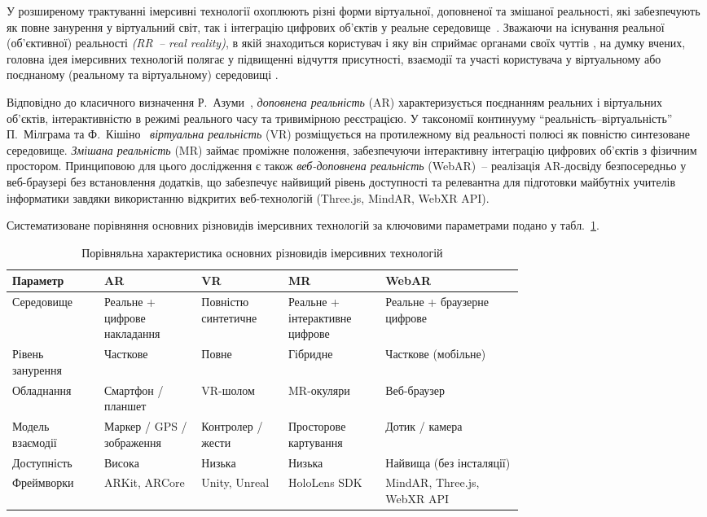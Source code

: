 У розширеному трактуванні імерсивні технології охоплюють різні форми віртуальної, доповненої та змішаної реальності, які забезпечують як повне занурення у віртуальний світ, так і інтеграцію цифрових об'єктів у реальне середовище~\cite{DiNatale2020Immersive}. Зважаючи на існування реальної (об'єктивної) реальності \emph{(RR~-- real reality)}, в якій знаходиться користувач і яку він сприймає органами своїх чуттів \cite{Omelchuk2024Secondary}, на думку вчених, головна ідея імерсивних технологій полягає у підвищенні відчуття присутності, взаємодії та участі користувача у віртуальному або поєднаному (реальному та віртуальному) середовищі \cite{Omelchuk2024Secondary, Semerikov2021Ref}.

Відповідно до класичного визначення Р.~Азуми~\cite{TechGlossaryAR2020}, \emph{доповнена реальність} (AR) характеризується поєднанням реальних і віртуальних об'єктів, інтерактивністю в режимі реального часу та тривимірною реєстрацією. У таксономії континууму ``реальність--віртуальність'' П.~Мілграма та Ф.~Кішіно~\cite{KVR2017Definition} \emph{віртуальна реальність} (VR) розміщується на протилежному від реальності полюсі як повністю синтезоване середовище. \emph{Змішана реальність} (MR) займає проміжне положення, забезпечуючи інтерактивну інтеграцію цифрових об'єктів з фізичним простором. Принциповою для цього дослідження є також \emph{веб-доповнена реальність} (WebAR)~-- реалізація AR-досвіду безпосередньо у веб-браузері без встановлення додатків, що забезпечує найвищий рівень доступності та релевантна для підготовки майбутніх учителів інформатики завдяки використанню відкритих веб-технологій (Three.js, MindAR, WebXR API).

Систематизоване порівняння основних різновидів імерсивних технологій за ключовими параметрами подано у табл.~\ref{tab:ar_vr_mr_comparison}.

\begin{table}[!h]
\caption{Порівняльна характеристика основних різновидів імерсивних технологій}\label{tab:ar_vr_mr_comparison}\small
\begin{tabularx}{\linewidth}{|p{0.18\linewidth}|p{0.19\linewidth}|p{0.17\linewidth}|p{0.19\linewidth}|X|}
\hline
\hfil \textbf{Параметр} & \hfil \textbf{AR} & \hfil \textbf{VR} & \hfil \textbf{MR} & \hfil \textbf{WebAR} \\
\hline
Середовище & Реальне + цифрове накладання & Повністю синтетичне & Реальне + інтерактивне цифрове & Реальне + браузерне цифрове \\
\hline
Рівень занурення & Часткове & Повне & Гібридне & Часткове (мобільне) \\
\hline
Обладнання & Смартфон / планшет & VR-шолом & MR-окуляри & Веб-браузер \\
\hline
Модель взаємодії & Маркер / GPS / зображення & Контролер / жести & Просторове картування & Дотик / камера \\
\hline
Доступність & Висока & Низька & Низька & Найвища (без інсталяції) \\
\hline
Фреймворки & ARKit, ARCore & Unity, Unreal & HoloLens SDK & MindAR, Three.js, WebXR API \\
\hline
\end{tabularx}
\end{table}


